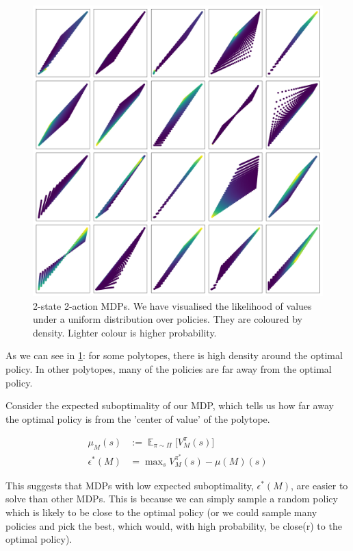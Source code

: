 \begin{figure}
\centering
\includegraphics[width=1\textwidth,height=1\textheight]{../../pictures/figures/polytope_densities.png}
\caption{2-state 2-action MDPs. We have visualised the likelihood of
values under a uniform distribution over policies. They are coloured by density.
Lighter colour is higher probability.}
\label{fig:density}
\end{figure}

As we can see in \ref{fig:density}: for some polytopes, there is high density around the optimal policy.
In other polytopes, many of the policies are far away from the optimal policy.

Consider the expected suboptimality of our MDP, which tells us how far away the
optimal policy is from the 'center of value' of the polytope.

\begin{align*}
\mu_M(s) &:= \mathop{\mathbb E}_{\pi\sim\Pi}\Big[V_M^{\pi}(s) \Big]\\
\epsilon^{* }(M) &= \mathop{\text{max}}_s V_M^{\pi^{* }}(s) - \mu(M)(s)
\end{align*}

This suggests that MDPs with low expected suboptimality, $\epsilon^{* }(M)$, are easier to solve than other MDPs.
This is because we can simply sample a random policy which is likely to be close to the optimal policy
(or we could sample many policies and pick the best, which would, with high probability, be close(r) to the optimal policy).


